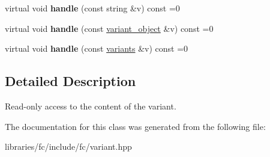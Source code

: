 \begin{DoxyCompactItemize}
virtual void {\bfseries handle} (const string \&v) const =0
\item 
\mbox{\label{classfc_1_1variant_1_1visitor_ac6c3149af76d47971353bd495f6f6087}} 
virtual void {\bfseries handle} (const \mbox{\hyperlink{classfc_1_1variant__object}{variant\+\_\+object}} \&v) const =0
\item 
\mbox{\label{classfc_1_1variant_1_1visitor_af98ef42aa795f1e00de108e5759f813a}} 
virtual void {\bfseries handle} (const \mbox{\hyperlink{classstd_1_1vector}{variants}} \&v) const =0
\end{DoxyCompactItemize}


\subsection{Detailed Description}
Read-\/only access to the content of the variant. 

The documentation for this class was generated from the following file\+:\begin{DoxyCompactItemize}
\item 
libraries/fc/include/fc/variant.\+hpp\end{DoxyCompactItemize}
